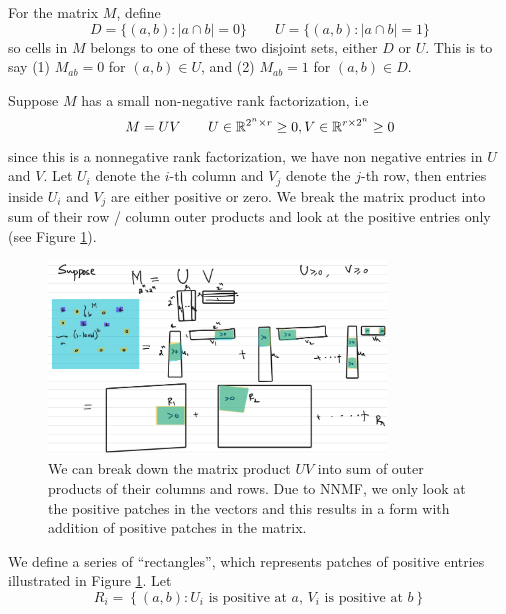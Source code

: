 For the matrix $M$, define 
\begin{equation}
	D = \{ (a, b) : |a \cap b| = 0 \} \quad \quad U = \{ (a, b) : | a \cap b | = 1 \}
\end{equation}
so cells in $M$ belongs to one of these two disjoint sets, either $D$ or $U$. This is to say (1) $M_{ab} = 0$ for $(a, b) \in U$, and (2) $M_{ab} = 1$ for $(a, b) \in D$. 

Suppose $M$ has a small non-negative rank factorization, i.e 
\begin{equation}
	M = UV \quad \quad U \in \mathbb{R}^{2^n \times r} \geq 0, V \in \mathbb{R}^{r \times 2^n} \geq 0
\end{equation}
since this is a nonnegative rank factorization, we have non negative entries in $U$ and $V$. Let $U_i$ denote the $i$-th column and $V_j$ denote the $j$-th row, then entries inside $U_i$ and $V_j$ are either positive or zero. We break the matrix product into sum of their row / column outer products and look at the positive entries only (see Figure \ref{fig:nnr-inclass-positive}).   

\begin{figure}
	\center
	\includegraphics[width=0.8\textwidth]{figs/nnr-inclass-positive.png}
	\caption{We can break down the matrix product $UV$ into sum of outer products of their columns and rows. Due to NNMF, we only look at the positive patches in the vectors and this results in a form with addition of positive patches in the matrix. }
	\label{fig:nnr-inclass-positive}
\end{figure}
 
We define a series of ``rectangles'', which represents patches of positive entries illustrated in Figure \ref{fig:nnr-inclass-positive}. Let
\begin{equation}
	R_{i} = \left\{ 
		(a, b) : \text{$U_i$ is positive at $a$, $V_i$ is positive at $b$}
	\right\}
\end{equation}

